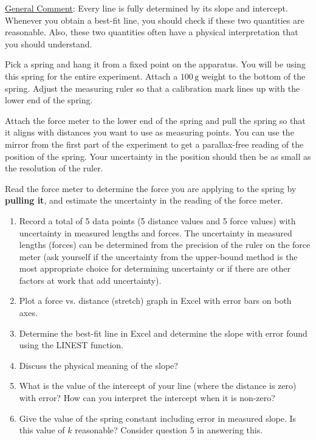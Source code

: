 \underline{General Comment}: Every line is fully determined by its slope and intercept. Whenever you obtain a best-fit line, you should check if these two quantities are reasonable. Also, these two quantities often have a physical interpretation that you should understand. \myskip

Pick a spring and hang it from a fixed point on the apparatus. You will be using this spring for the entire experiment. Attach a $100\,\mathrm{g}$ weight to the bottom of the spring. Adjust the measuring ruler so that a calibration mark lines up with the lower end of the spring. \myskip

Attach the force meter to the lower end of the spring and pull the spring so that it aligns with distances you want to use as measuring points. You can use the mirror from the first part of the experiment to get a parallax-free reading of the position of the spring. Your uncertainty in the position should then be as small as the resolution of the ruler. \myskip

Read the force meter to determine the force you are applying to the spring by {\bf{pulling it}}, and estimate the uncertainty in the reading of the force meter.

\begin{enumerate}
    \item Record a total of 5 data points (5 distance values and 5 force values) with uncertainty in measured lengths and forces. The uncertainty in measured lengths (forces) can be determined from the precision of the ruler on the force meter (ask yourself if the uncertainty from the upper-bound method is the most appropriate choice for determining uncertainty or if there are other factors at work that add uncertainty).
    \item Plot a force vs. distance (stretch) graph in Excel with error bars on both axes.
    \item Determine the best-fit line in Excel and determine the slope with error found using the LINEST function.
    \item Discuss the physical meaning of the slope?
    \item What is the value of the intercept of your line (where the distance is zero) with error?  How can you interpret the intercept when it is non-zero?
    \item Give the value of the spring constant including error in measured slope. Is this value of $k$ reasonable? Consider question 5 in answering this.
\end{enumerate}

